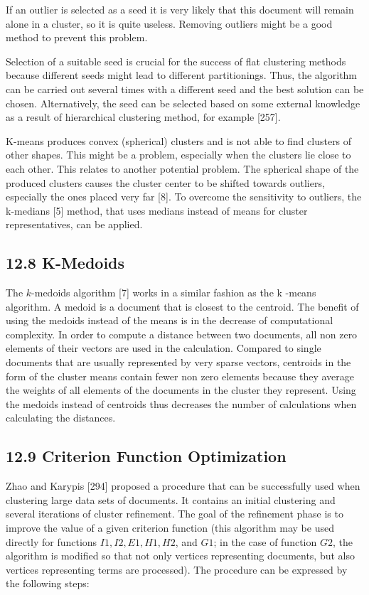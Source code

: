 \documentclass[10pt]{book}
\begin{document}
If an outlier is selected as a seed it is very likely that this document will remain alone in a cluster, so it is quite useless. Removing outliers might be a good method to prevent this problem.

Selection of a suitable seed is crucial for the success of flat clustering methods because different seeds might lead to different partitionings. Thus, the algorithm can be carried out several times with a different seed and the best solution can be chosen. Alternatively, the seed can be selected based on some external knowledge as a result of hierarchical clustering method, for example [257].

K-means produces convex (spherical) clusters and is not able to find clusters of other shapes. This might be a problem, especially when the clusters lie close to each other. This relates to another potential problem. The spherical shape of the produced clusters causes the cluster center to be shifted towards outliers, especially the ones placed very far [8]. To overcome the sensitivity to outliers, the k-medians [5] method, that uses medians instead of means for cluster representatives, can be applied.

\subsection*{12.8 K-Medoids}
The $k$-medoids algorithm [7] works in a similar fashion as the k -means algorithm. A medoid is a document that is closest to the centroid. The benefit of using the medoids instead of the means is in the decrease of computational complexity. In order to compute a distance between two documents, all non zero elements of their vectors are used in the calculation. Compared to single documents that are usually represented by very sparse vectors, centroids in the form of the cluster means contain fewer non zero elements because they average the weights of all elements of the documents in the cluster they represent. Using the medoids instead of centroids thus decreases the number of calculations when calculating the distances.

\subsection*{12.9 Criterion Function Optimization}
Zhao and Karypis [294] proposed a procedure that can be successfully used when clustering large data sets of documents. It contains an initial clustering and several iterations of cluster refinement. The goal of the refinement phase is to improve the value of a given criterion function (this algorithm may be used directly for functions $I 1, I 2, E 1, H 1, H 2$, and $G 1$; in the case of function $G 2$, the algorithm is modified so that not only vertices representing documents, but also vertices representing terms are processed). The procedure can be expressed by the following steps:
\end{document}
